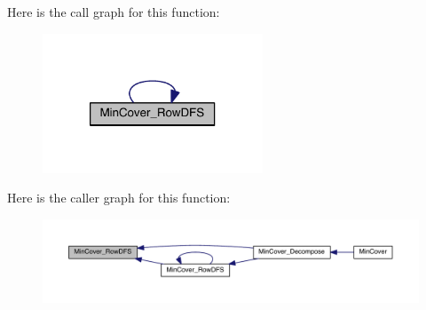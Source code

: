 Here is the call graph for this function\+:\nopagebreak
\begin{figure}[H]
\begin{center}
\leavevmode
\includegraphics[width=186pt]{a00245_a807020dce58bb03a180aa4a0cb8cdd3e_cgraph}
\end{center}
\end{figure}
Here is the caller graph for this function\+:\nopagebreak
\begin{figure}[H]
\begin{center}
\leavevmode
\includegraphics[width=350pt]{a00245_a807020dce58bb03a180aa4a0cb8cdd3e_icgraph}
\end{center}
\end{figure}
